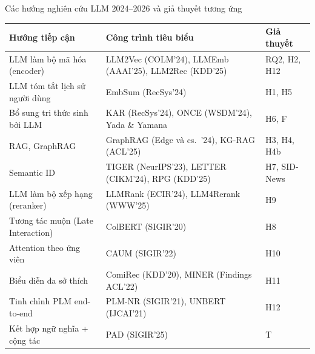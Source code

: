 \documentclass[aspectratio=169,t]{beamer}
\begin{document}
\begin{frame}[shrink]{Các hướng nghiên cứu LLM 2024--2026 và giả thuyết tương ứng}
\scriptsize
\renewcommand{\arraystretch}{1.08}
\begin{tabularx}{\textwidth}{@{}P{3.5cm}YP{2.4cm}@{}}
\toprule
\textbf{Hướng tiếp cận} & \textbf{Công trình tiêu biểu} & \textbf{Giả thuyết}\\
\midrule
LLM làm bộ mã hóa (encoder) & LLM2Vec (COLM'24), LLMEmb (AAAI'25), LLM2Rec (KDD'25) & RQ2, H2, H12\\
LLM tóm tắt lịch sử người dùng & EmbSum (RecSys'24) & H1, H5\\
Bổ sung tri thức sinh bởi LLM & KAR (RecSys'24), ONCE (WSDM'24), Yada \& Yamana & H6, F\\
RAG, GraphRAG & GraphRAG (Edge và cs.\ '24), KG-RAG (ACL'25) & H3, H4, H4b\\
Semantic ID & TIGER (NeurIPS'23), LETTER (CIKM'24), RPG (KDD'25) & H7, SID-News\\
LLM làm bộ xếp hạng (reranker) & LLMRank (ECIR'24), LLM4Rerank (WWW'25) & H9\\
Tương tác muộn (Late Interaction) & ColBERT (SIGIR'20) & H8\\
Attention theo ứng viên & CAUM (SIGIR'22) & H10\\
Biểu diễn đa sở thích & ComiRec (KDD'20), MINER (Findings ACL'22) & H11\\
Tinh chỉnh PLM end-to-end & PLM-NR (SIGIR'21), UNBERT (IJCAI'21) & H12\\
Kết hợp ngữ nghĩa + cộng tác & PAD (SIGIR'25) & T\\
\bottomrule
\end{tabularx}
\par\kern0pt%
\end{frame}
\end{document}
